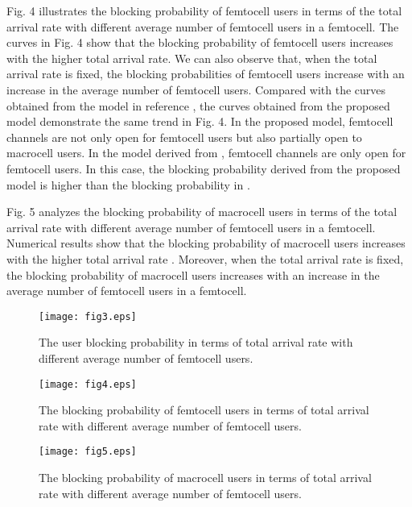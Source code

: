 \documentclass[10pt,final,journal,letterpaper,twoside,twocolumn]{IEEEtran}
\begin{document}
Fig. 4 illustrates the blocking probability of femtocell users   in terms of the total arrival rate  with different average number of femtocell users in a femtocell. The curves in Fig. 4 show that the blocking probability of femtocell users  increases with the higher total arrival rate. We can also observe that, when the total arrival rate  is fixed, the blocking probabilities of femtocell users increase with an increase in the average number of femtocell users. Compared with the curves obtained from the model in reference \cite{Zhang10}, the curves obtained from the proposed model demonstrate the same trend in Fig. 4. In the proposed model, femtocell channels are not only open for femtocell users but also partially open to macrocell users. In the model derived from \cite{Zhang10}, femtocell channels are only open for femtocell users. In this case, the blocking probability derived from the proposed model is higher than the blocking probability in \cite{Zhang10}.

Fig. 5 analyzes the blocking probability of macrocell users  in terms of the total arrival rate  with different average number of femtocell users in a femtocell. Numerical results show that the blocking probability of macrocell users  increases with the higher total arrival rate . Moreover, when the total arrival rate  is fixed, the blocking probability of macrocell users increases with an increase in the average number of femtocell users in a femtocell.

\begin{figure}
\vspace{0.1in}
\centerline{\texttt{[image: fig3.eps]}}
\caption{\small The user blocking probability in terms of
total arrival rate with different average number of femtocell users.}
\end{figure}
\begin{figure}
\vspace{0.1in}
\centerline{\texttt{[image: fig4.eps]}}
\caption{\small  The blocking probability of femtocell users in terms of
total arrival rate with different average number of femtocell users.}
\end{figure}
\begin{figure}
\vspace{0.1in}
\centerline{\texttt{[image: fig5.eps]}}
\caption{\small  The blocking probability of macrocell users in terms of
total arrival rate with different average number of femtocell users.}
\end{figure}
\end{document}
